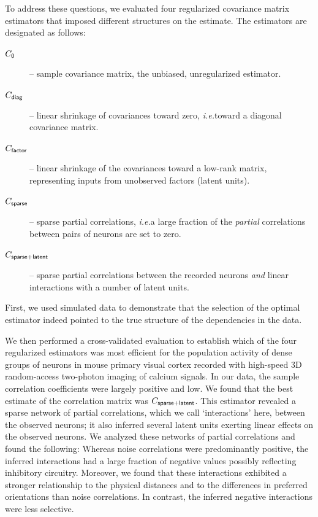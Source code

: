 \documentclass[10pt]{article}
\newcommand{\sq}[1]{\lq#1\rq}
\newcommand{\ie}{\emph{i.e.}\;}
\begin{document}
To address these questions, we evaluated four regularized covariance matrix estimators that imposed different structures on the estimate. The estimators are designated as follows:
\begin{description}
\item[$C_{\sf 0}$] -- sample covariance matrix, the unbiased, unregularized estimator.
\item[$C_{\sf diag}$] -- linear shrinkage of covariances toward zero, \ie toward a diagonal covariance matrix.
\item[$C_{\sf factor}$] -- linear shrinkage of the covariances toward a low-rank matrix, representing inputs from unobserved factors (latent units).
\item[$C_{\sf sparse}$] -- sparse partial correlations, \ie a large fraction of the \emph{partial} correlations between pairs of neurons are set to zero.
\item[$C_{\sf sparse+latent}$] -- sparse partial correlations between the recorded neurons \emph{and} linear interactions with a number of latent units.
\end{description} 

First, we used simulated data to demonstrate that the selection of the optimal estimator indeed pointed to the true structure of the dependencies in the data. 

We then performed a cross-validated evaluation to establish which of the four regularized estimators was most efficient for the population activity of dense groups of neurons in mouse primary visual cortex recorded with high-speed 3D random-access two-photon imaging of calcium signals. In our data, the sample correlation coefficients were largely positive and low.  We found that the best estimate of the correlation matrix was $C_{\sf sparse+latent}$.  This estimator revealed a sparse network of partial correlations, which we call \sq{interactions} here, between the observed neurons; it also inferred several latent units exerting linear effects on the observed neurons. We analyzed these networks of partial correlations and found the following: Whereas noise correlations were predominantly positive, the inferred interactions had a large fraction of negative values possibly reflecting inhibitory circuitry.  Moreover, we found that these interactions exhibited a stronger relationship to the physical distances and to the differences in preferred orientations than noise correlations. In contrast, the inferred negative interactions were less selective. 
\end{document}
